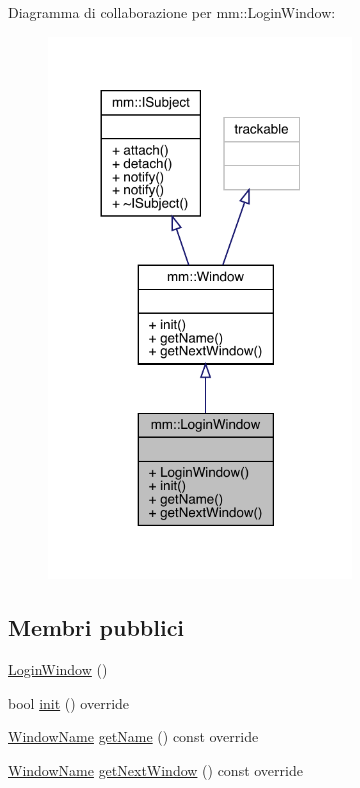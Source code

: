 Diagramma di collaborazione per mm\+:\+:Login\+Window\+:
\nopagebreak
\begin{figure}[H]
\begin{center}
\leavevmode
\includegraphics[width=228pt]{d7/de2/classmm_1_1_login_window__coll__graph}
\end{center}
\end{figure}
\subsection*{Membri pubblici}
\begin{DoxyCompactItemize}
\item 
\mbox{\hyperlink{classmm_1_1_login_window_ad27cc1365af4fec51bd7afb1a9d49cf5}{Login\+Window}} ()
\item 
bool \mbox{\hyperlink{classmm_1_1_login_window_a4040d7c1f85fc76e1f60ef13f92bef1c}{init}} () override
\item 
\mbox{\hyperlink{namespacemm_a4e9d92e04f65dbf2fc1963947da0d93c}{Window\+Name}} \mbox{\hyperlink{classmm_1_1_login_window_aa0597e725bfb2df984f526112080aaf7}{get\+Name}} () const override
\item 
\mbox{\hyperlink{namespacemm_a4e9d92e04f65dbf2fc1963947da0d93c}{Window\+Name}} \mbox{\hyperlink{classmm_1_1_login_window_a399eb7e1a310016ff83b7aa6a9d69722}{get\+Next\+Window}} () const override
\end{DoxyCompactItemize}


